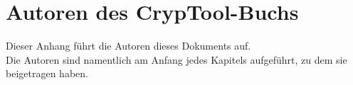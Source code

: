 
\newpage
\hypertarget{appendix-authors}{}
\section{Autoren des CrypTool-Buchs}
\label{s:appendix-authors}

Dieser Anhang führt die Autoren dieses Dokuments auf.\\
Die Autoren sind namentlich am Anfang jedes Kapitels aufgeführt,
zu dem sie beigetragen haben.

